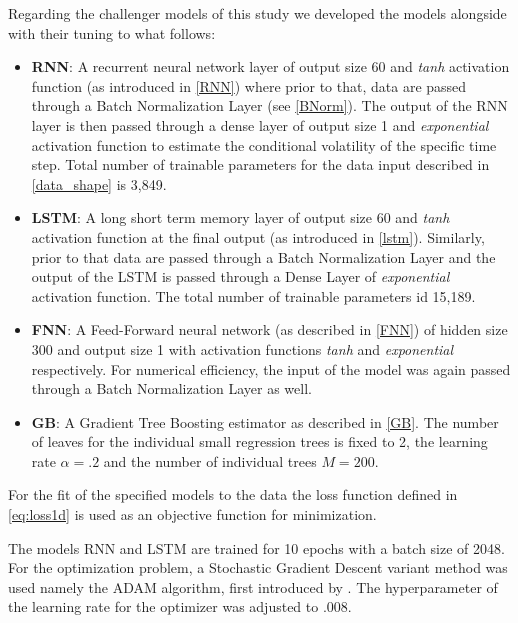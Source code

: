 \documentclass[a4paper, oneside]{discothesis}
\begin{document}
Regarding the challenger models of this study we developed the models alongside with their tuning to what follows:
\begin{itemize}
    \item \textbf{RNN}:
    A recurrent neural network layer of output size 60 and \textit{tanh} activation function (as introduced in \ref{RNN}) where prior to that, data are passed through a Batch Normalization Layer  (see \ref{BNorm}). The output of the RNN layer is then passed through a dense layer of output size 1 and \textit{exponential} activation function to estimate the conditional volatility of the specific time step. Total number of trainable parameters for the data input described in \ref{data_shape} is 3,849.
    
    \item \textbf{LSTM}:
    A long short term memory layer of output size 60 and \textit{tanh} activation function at the final output (as introduced in \ref{lstm}). Similarly, prior to that data are passed through a Batch Normalization Layer and the output of the LSTM is passed through a Dense Layer of \textit{exponential} activation function. The total number of trainable parameters id 15,189.
    
    \item \textbf{FNN}: 
    A Feed-Forward neural network (as described in \ref{FNN}) of hidden size 300 and output size 1 with activation functions \textit{tanh} and \textit{exponential} respectively. For numerical efficiency, the input of the model was again passed through a Batch Normalization Layer as well.
    
    \item \textbf{GB}:
    A Gradient Tree Boosting estimator as described in \ref{GB}. The number of leaves for the individual small regression trees is fixed to 2, the learning rate $\alpha = .2$ and the number of individual trees $M = 200$. 
    
\end{itemize}


For the fit of the specified models to the data the loss function defined in \ref{eq:loss1d} is used as an objective function for minimization.

The models RNN and LSTM are trained for 10 epochs with a batch size of 2048. For the optimization problem, a Stochastic Gradient Descent variant method was used namely the ADAM algorithm, first introduced by \cite{Adam}. The hyperparameter of the learning rate for the optimizer was adjusted to .008.
\end{document}

